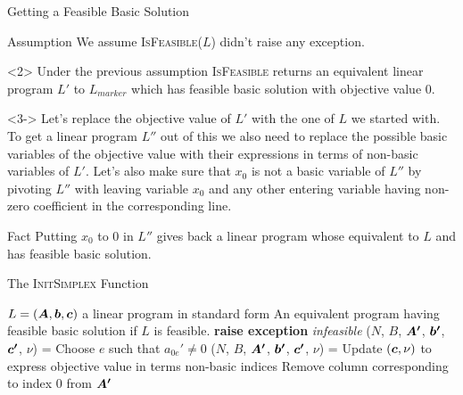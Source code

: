 \documentclass[32pt, aspectratio = 169]{beamer}
\begin{document}
\begin{frame}{Getting a Feasible Basic Solution}
    \begin{halfshyblock}{Assumption}
        We assume \textsc{IsFeasible}($L$) didn't raise any exception.
    \end{halfshyblock}
    \vspace{.5\baselineskip}
    \begin{overlayarea}{\textwidth}{.6\textheight}
        \begin{onlyenv}<2>
            Under the previous assumption \textsc{IsFeasible} returns an equivalent linear program $L'$ to $L_{marker}$ which has feasible basic solution with objective value $0$.
        \end{onlyenv}
        \begin{onlyenv}<3->
            Let's replace the objective value of $L'$ with the one of $L$ we started with. To get a linear program $L''$ out of this we also need to replace the possible basic variables of the objective value with their expressions in terms of non-basic variables of $L'$. Let's also make sure that $x_0$ is not a basic variable of $L''$ by pivoting $L''$ with leaving variable $x_0$ and any other entering variable having non-zero coefficient in the corresponding line.
            \vspace{.5\baselineskip}
            \begin{halfshyblock}{Fact}
                Putting $x_0$ to $0$ in $L''$ gives back a linear program whose equivalent to $L$ and has feasible basic solution.
            \end{halfshyblock}
        \end{onlyenv}
    \end{overlayarea}
\end{frame}

\begin{frame}{The \textsc{InitSimplex} Function}
    \small{
    \begin{algorithmic}[1]
        \Require $L = (\boldsymbol{A}, \boldsymbol{b}, \boldsymbol{c})$ a linear program in standard form
        \Ensure An equivalent program having feasible basic solution if $L$ is feasible.
                \State \textbf{raise exception} \textit{infeasible}
            \Else
                \State ($N$, $B$, $\boldsymbol{A'}$, $\boldsymbol{b'}$, $\boldsymbol{c'}$, $\nu$) = 
                    \State Choose $e$ such that $a_{0e}' \neq 0$
                    \State ($N$, $B$, $\boldsymbol{A'}$, $\boldsymbol{b'}$, $\boldsymbol{c'}$, $\nu$) = 
                \EndIf
                \State Update $(\boldsymbol{c}, \nu)$ to express objective value in terms non-basic indices
                \State Remove column corresponding to index $0$ from $\boldsymbol{A'}$
                \State {}
            \EndIf
        \EndFunction
        \Statex
    \end{algorithmic}
    }
\end{frame}
\end{document}

